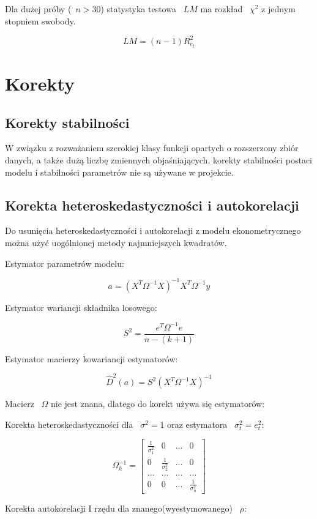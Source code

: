 \documentclass{article}
\begin{document}
Dla dużej próby (~$n>30$) statystyka testowa ~$LM$ ma rozkład ~$\chi^2$ z jednym stopniem swobody.

\[LM = (n-1)R_{e_t}^2\]

\newpage
\section{Korekty}

\subsection{Korekty stabilności}
W związku z rozważaniem szerokiej klasy funkcji opartych o rozszerzony zbiór danych, a także dużą liczbę zmiennych objaśniających, korekty stabilności postaci modelu i stabilności parametrów nie są używane w projekcie.

\subsection{Korekta heteroskedastyczności i autokorelacji}
Do usunięcia heteroskedastyczności i autokorelacji z modelu ekonometrycznego można użyć uogólnionej metody najmniejszych kwadratów.

Estymator parametrów modelu:

\[a = (X^T\Omega^{-1}X)^{-1}X^T\Omega^{-1}y\]

Estymator wariancji składnika losowego:

\[S^2=\frac{e^T\Omega^{-1}e}{n - (k+1)}\]

Estymator macierzy kowariancji estymatorów:

\[\hat{D}^2(a)=S^2(X^T\Omega^{-1}X)^{-1}\]

Macierz ~$\Omega$ nie jest znana, dlatego do korekt używa się estymatorów:

Korekta heteroskedastyczności dla ~$\sigma^2 = 1$ oraz estymatora ~$\sigma_t^2=e_t^2$:

\begin{equation*}
    \Omega_{h}^{-1}=
    \begin{bmatrix}
        \frac{1}{\sigma_1^2} & 0 & ... & 0 \\
        0 & \frac{1}{\sigma_2^2} & ... & 0 \\
        ... & ... & ... & ... \\
        0 & 0 & ... & \frac{1}{\sigma_n^2}
    \end{bmatrix}
\end{equation*}

Korekta autokorelacji I rzędu dla znanego(wyestymowanego) ~$\rho$:
\end{document}

